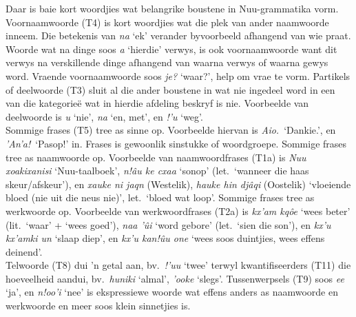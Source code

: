 Daar is baie kort woordjies wat belangrike boustene in
N\textipa{\textvertline}uu-grammatika vorm. Voornaamwoorde (T4) is
kort \mbox{woordjies} wat die plek van ander naamwoorde inneem. Die
betekenis van \emph{na} `ek' verander byvoorbeeld afhangend van wie
praat.  Woorde wat na dinge soos \emph{a} `hierdie' verwys, is ook
voornaamwoorde want dit verwys na verskillende dinge afhangend van
waarna verwys of waarna gewys word. Vraende voornaamwoorde soos
\emph{je?} `waar?', help om vrae te vorm. Partikels of deelwoorde (T3)
sluit al die ander boustene in wat nie ingedeel word in een van die
kategorie\"{e} wat in hierdie afdeling beskryf is nie. Voorbeelde van
deelwoorde is \emph{\textipa{\textdoublevertline}u} `nie',
\emph{n\textipa{\textvertline}a} `en, met', en \emph{!'u} `weg'.\\

Sommige frases (T5) tree as sinne op. Voorbeelde hiervan is
\emph{Aio.}\ `Dankie.', en \emph{\textipa{\textdoublebarpipe}'An'a!}\
`Pasop!' in. Frases is gewoonlik sinstukke of woordgroepe. Sommige
frases tree as naamwoorde op.  Voorbeelde van naamwoordfrases (T1a) is
\emph{N\textipa{\textvertline}uu
\textipa{\textdoublebarpipe}xoaki\textipa{\textdoublebarpipe}xanisi}
`N\textipa{\textvertline}uu-taalboek', \emph{n!\^{a}u ke cxaa} `sonop'
(let.\ `wanneer die haas skeur/afskeur'), en
\emph{\textipa{\textdoublevertline}xauke ni jaqn} (Westelik),
\emph{\textipa{\textdoublevertline}hauke hin dj\^{a}qi} (Oostelik)
`vloeiende bloed (nie uit die neus nie)', let.\ `bloed wat loop'.
Sommige frases tree as werkwoorde op. Voorbeelde van werkwoordfrases
(T2a) is \emph{kx'am kq\^{o}e} `wees beter' (lit.\ `waar' + `wees
goed'), \emph{n\textipa{\textvertline}aa
\textipa{\textdoublevertline}'\^{u}i} `word gebore' (let.\ `sien die
son'), en \emph{kx'u kx'amki un} `slaap diep', en
\emph{kx'u kan!\^{u}u \textipa{\!o}one} `wees soos duintjies, wees
effens deinend'.\\

Telwoorde (T8) dui 'n getal aan, bv.\ \emph{!'uu} `twee' terwyl
kwantifiseerders (T11) die hoeveelheid aandui, bv.\ \emph{huniki}
`almal', \emph{\textipa{\textdoublevertline}'ooke} `slegs'.
Tussenwerpsels (T9) soos \emph{ee} `ja', en \emph{n!oo'i} `nee' is
ekspressiewe woorde wat effens anders as naamwoorde en werkwoorde en
meer soos klein sinnetjies is.\\

